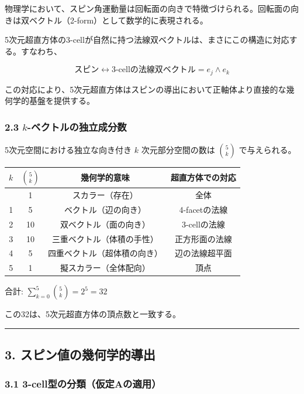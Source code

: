 \documentclass[a4paper,11pt]{ltjsarticle}
\newcounter{none}
\begin{document}
物理学において、スピン角運動量は回転面の向きで特徴づけられる。回転面の向きは双ベクトル（2-form）として数学的に表現される。

5次元超直方体の3-cellが自然に持つ法線双ベクトルは、まさにこの構造に対応する。すなわち、

\[\text{スピン} \longleftrightarrow \text{3-cellの法線双ベクトル} = e_j \wedge e_k\]

この対応により、5次元超直方体はスピンの導出において正軸体より直接的な幾何学的基盤を提供する。

\subsubsection*{2.3 $k$-ベクトルの独立成分数}

5次元空間における独立な向き付き $k$ 次元部分空間の数は $\binom{5}{k}$ で与えられる。

{\def\LTcaptype{none}
\begin{longtable}[]{@{}cccc@{}}
\toprule
$k$ & $\binom{5}{k}$ & 幾何学的意味 & 超直方体での対応 \\
\midrule
\endhead
\bottomrule
\endlastfoot
0 & 1 & スカラー（存在） & 全体 \\
1 & 5 & ベクトル（辺の向き） & 4-facetの法線 \\
2 & 10 & 双ベクトル（面の向き） & 3-cellの法線 \\
3 & 10 & 三重ベクトル（体積の手性） & 正方形面の法線 \\
4 & 5 & 四重ベクトル（超体積の向き） & 辺の法線超平面 \\
5 & 1 & 擬スカラー（全体配向） & 頂点 \\
\end{longtable}
}

合計: $\sum_{k=0}^{5} \binom{5}{k} = 2^5 = 32$

この32は、5次元超直方体の頂点数と一致する。

\begin{center}\rule{0.5\linewidth}{0.5pt}\end{center}

\subsection*{3. スピン値の幾何学的導出}

\subsubsection*{3.1 3-cell型の分類（仮定Aの適用）}
\end{document}
